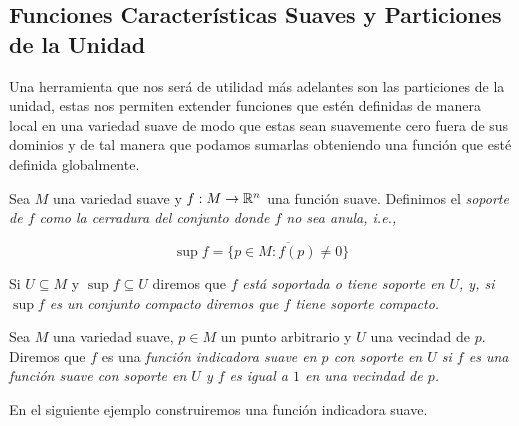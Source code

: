 \subsection{Funciones Características Suaves y Particiones de la Unidad} \label{Subsección: Funciones Características Suaves y Particiones De La Unidad}
Una herramienta que nos será de utilidad más adelantes son las particiones de la unidad, estas nos permiten extender funciones que estén definidas de manera local en una variedad suave de modo que estas sean suavemente cero fuera de sus dominios y de tal manera que podamos sumarlas obteniendo una función que esté definida globalmente.

\begin{definition}\label{Definición: Soporte de una Función}
	Sea $M$ una variedad suave y $f: M \to \mathbb{R}^n$ una función suave. Definimos el \it{soporte de} $f$ como la cerradura del conjunto donde $f$ no sea anula, i.e.,

	\[ \sup f = \overline{ \{ p \in M : f(p) \neq 0 \}} \]

	Si $U \subseteq M$ y $\sup f \subseteq U$ diremos que $f$ \it{está soportada} o \it{tiene soporte en} $U$, y, si $\sup f$ es un conjunto compacto diremos que $f$ tiene \it{soporte compacto}.
\end{definition}

\begin{definition}\label{Definición: Función Indicadora Suave}
	Sea $M$ una variedad suave, $p \in M$ un punto arbitrario y $U$ una vecindad de $p$. Diremos que $f$ es una \it{función indicadora suave en $p$ con soporte en} $U$ si $f$ es una función suave con soporte en $U$ y $f$ es igual a $1$ en una vecindad de $p$.
\end{definition}


En el siguiente ejemplo construiremos una función indicadora suave.

